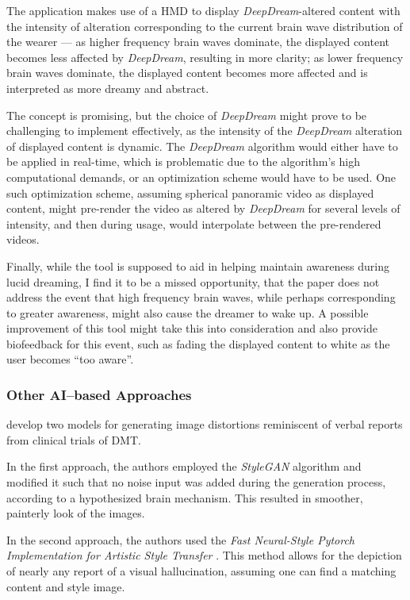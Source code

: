 The application makes use of a \ac{HMD} to display \textit{DeepDream}-altered \autocite{mordvintsev2015inceptionism} content with the intensity of alteration corresponding to the current brain wave distribution of the wearer --- as higher frequency brain waves dominate, the displayed content becomes less affected by \textit{DeepDream}, resulting in more clarity; as lower frequency brain waves dominate, the displayed content becomes more affected and is interpreted as more dreamy and abstract.

The concept is promising, but the choice of \textit{DeepDream} might prove to be challenging to implement effectively, as the intensity of the \textit{DeepDream} alteration of displayed content is dynamic. The \textit{DeepDream} algorithm would either have to be applied in real-time, which is problematic due to the algorithm's high computational demands, or an optimization scheme would have to be used. One such optimization scheme, assuming spherical panoramic video as displayed content, might pre-render the video as altered by \textit{DeepDream} for several levels of intensity, and then during usage, would interpolate between the pre-rendered videos.

Finally, while the tool is supposed to aid in helping maintain awareness during lucid dreaming, I find it to be a missed opportunity, that the paper does not address the event that high frequency brain waves, while perhaps corresponding to greater awareness, might also cause the dreamer to wake up. A possible improvement of this tool might take this into consideration and also provide biofeedback for this event, such as fading the displayed content to white as the user becomes ``too aware''.

\subsubsection{Other AI--based Approaches}
\textcite{schartner2020neural} develop two models for generating image distortions reminiscent of verbal reports from clinical trials of \ac{DMT}.

In the first approach, the authors employed the \textit{StyleGAN} algorithm \autocite{karras2019cvpr} and modified it such that no noise input was added during the generation process, according to a hypothesized brain mechanism. This resulted in smoother, painterly look of the images.

In the second approach, the authors used the \textit{Fast Neural-Style Pytorch Implementation for Artistic Style Transfer} \autocite{johnson2016perceptual}. This method allows for the depiction of nearly any report of a visual hallucination, assuming one can find a matching content and style image.

